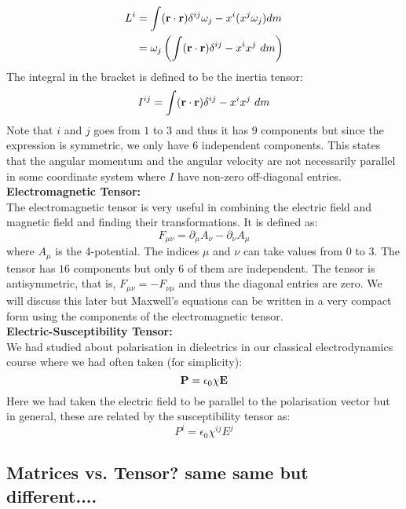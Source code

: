 \begin{align*}
    L^i &= \int (\veb{r}\cdot \veb{r})\tensor*{\delta}{^i^j}\omega_j - x^i(x^j\omega_j)dm\\
    &= \omega_j \brac{\int (\veb{r}\cdot \veb{r})\tensor*{\delta}{^i^j} - x^ix^j\ dm} 
\end{align*}
The integral in the bracket is defined to be the inertia tensor:
$$I^{ij} = \int (\veb{r}\cdot \veb{r})\tensor*{\delta}{^i^j} - x^ix^j \ dm$$
Note that $i$ and $j$ goes from $1$ to $3$ and thus it has $9$ components but since the expression is symmetric, we only have $6$ independent components. This states that the angular momentum and the angular velocity are not necessarily parallel in some coordinate system where $I$ have non-zero off-diagonal entries.\\[0.3cm]
\textbf{Electromagnetic Tensor:}\\[0.3cm]
The electromagnetic tensor is very useful in combining the electric field and magnetic field and finding their transformations. It is defined as:
$$F_{\mu\nu} = \partial_\mu A_\nu - \partial_\nu A_\mu$$
where $A_\mu$ is the 4-potential. The indices $\mu$ and $\nu$ can take values from $0$ to $3$. The tensor has $16$ components but only $6$ of them are independent. The tensor is antisymmetric, that is, $F_{\mu\nu} = -F_{\nu\mu}$ and thus the diagonal entries are zero. We will discuss this later but Maxwell's equations can be written in a very compact form using the components of the electromagnetic tensor.\\[0.3cm]
\textbf{Electric-Susceptibility Tensor:}\\[0.3cm]
We had studied about polarisation in dielectrics in our classical electrodynamics course where we had often taken (for simplicity):
$$\boldsymbol{\mathbf{P}} = \epsilon_0\chi\boldsymbol{\mathbf{E}}$$
Here we had taken the electric field to be parallel to the polarisation vector but in general, these are related by the susceptibility tensor as:
$$P^i = \epsilon_0\chi^{ij}E^{j}$$
\subsection{Matrices vs. Tensor? same same but different....}